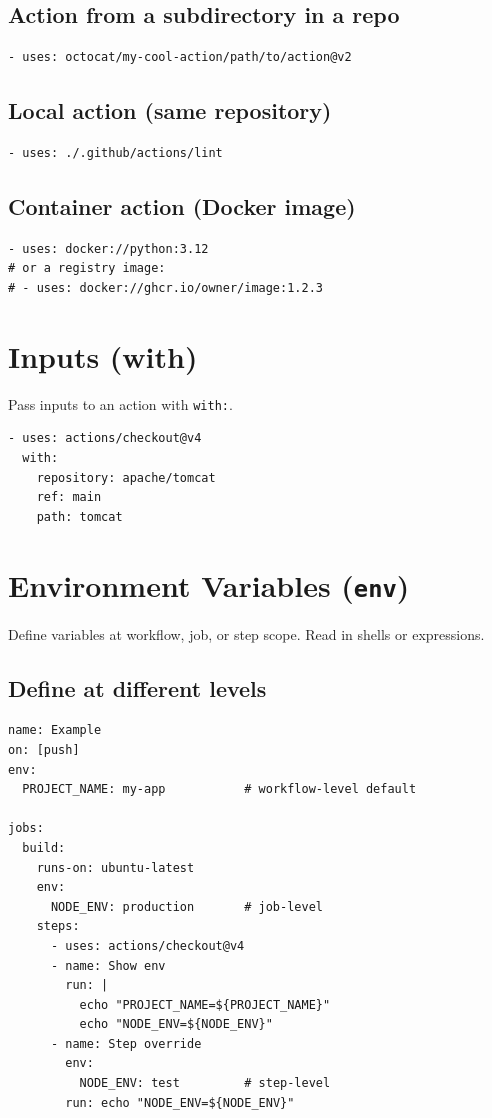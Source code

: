 \documentclass[11pt]{article}
\begin{document}
\subsection{Action from a subdirectory in a repo}
\begin{verbatim}
- uses: octocat/my-cool-action/path/to/action@v2
\end{verbatim}

\subsection{Local action (same repository)}
\begin{verbatim}
- uses: ./.github/actions/lint
\end{verbatim}

\subsection{Container action (Docker image)}
\begin{verbatim}
- uses: docker://python:3.12
# or a registry image:
# - uses: docker://ghcr.io/owner/image:1.2.3
\end{verbatim}

\section{Inputs (with)}
Pass inputs to an action with \texttt{with:}.
\begin{verbatim}
- uses: actions/checkout@v4
  with:
    repository: apache/tomcat
    ref: main
    path: tomcat
\end{verbatim}

\section{Environment Variables (\texttt{env})}
Define variables at workflow, job, or step scope. Read in shells or expressions.
\subsection{Define at different levels}
\begin{verbatim}
name: Example
on: [push]
env:
  PROJECT_NAME: my-app           # workflow-level default

jobs:
  build:
    runs-on: ubuntu-latest
    env:
      NODE_ENV: production       # job-level
    steps:
      - uses: actions/checkout@v4
      - name: Show env
        run: |
          echo "PROJECT_NAME=${PROJECT_NAME}"
          echo "NODE_ENV=${NODE_ENV}"
      - name: Step override
        env:
          NODE_ENV: test         # step-level
        run: echo "NODE_ENV=${NODE_ENV}"
\end{verbatim}
\end{document}
